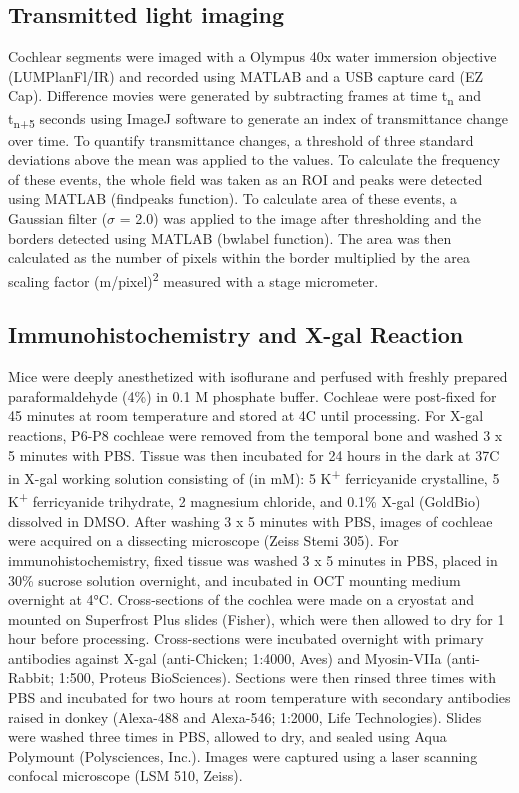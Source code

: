 \documentclass[9pt,lineno]{elife}
\begin{document}
\subsection{Transmitted light imaging}
Cochlear segments were imaged with a Olympus 40x water immersion objective (LUMPlanFl/IR) and recorded using MATLAB and a USB capture card (EZ Cap). Difference movies were generated by subtracting frames at time t\textsubscript{n} and t\textsubscript{n+5} seconds using ImageJ software to generate an index of transmittance change over time. To quantify transmittance changes, a threshold of three standard deviations above the mean was applied to the values. To calculate the frequency of these events, the whole field was taken as an ROI and peaks were detected using MATLAB (findpeaks function). To calculate area of these events, a Gaussian filter ($ \sigma $ = 2.0) was applied to the image after thresholding and the borders detected using MATLAB (bwlabel function). The area was then calculated as the number of pixels within the border multiplied by the area scaling factor (\textmu m/pixel)\textsuperscript{2} measured with a stage micrometer.

\subsection{Immunohistochemistry and X-gal Reaction}
Mice were deeply anesthetized with isoflurane and perfused with freshly prepared paraformaldehyde (4\%) in 0.1 M phosphate buffer. Cochleae were post-fixed for 45 minutes at room temperature and stored at 4\textdegree C until processing. For X-gal reactions, P6-P8 cochleae were removed from the temporal bone and washed 3 x 5 minutes with PBS. Tissue was then incubated for 24 hours in the dark at 37\textdegree C in X-gal working solution consisting of (in mM): 5 K\textsuperscript{+} ferricyanide crystalline, 5 K\textsuperscript{+} ferricyanide trihydrate, 2 magnesium chloride, and 0.1\% X-gal (GoldBio) dissolved in DMSO. After washing 3 x 5 minutes with PBS, images of cochleae were acquired on a dissecting microscope (Zeiss Stemi 305). For immunohistochemistry, fixed tissue was washed 3 x 5 minutes in PBS, placed in 30\% sucrose solution overnight, and incubated in OCT mounting medium overnight at 4°C. Cross-sections of the cochlea were made on a cryostat and mounted on Superfrost Plus slides (Fisher), which were then allowed to dry for 1 hour before processing. Cross-sections were incubated overnight with primary antibodies against X-gal (anti-Chicken; 1:4000, Aves) and Myosin-VIIa (anti-Rabbit; 1:500, Proteus BioSciences). Sections were then rinsed three times with PBS and incubated for two hours at room temperature with secondary antibodies raised in donkey (Alexa-488 and Alexa-546; 1:2000, Life Technologies). Slides were washed three times in PBS, allowed to dry, and sealed using Aqua Polymount (Polysciences, Inc.). Images were captured using a laser scanning confocal microscope (LSM 510, Zeiss).
\end{document}
